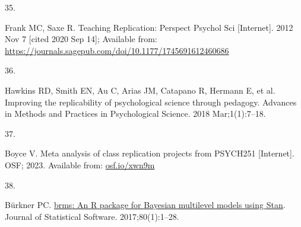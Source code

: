 \documentclass[
  english,
  a4paper,
]{article}
\newlength{\cslhangindent}
\newlength{\csllabelwidth}
\newlength{\cslentryspacingunit} %
\newenvironment{CSLReferences}[2] %
 {%
  \setlength{\parindent}{0pt}
  \ifodd #1
  \let\oldpar\par
  \def\par{\hangindent=\cslhangindent\oldpar}
  \fi
  \setlength{\parskip}{#2\cslentryspacingunit}
 }%
 {}
\newcommand{\CSLLeftMargin}[1]{\parbox[t]{\csllabelwidth}{#1}}
\newcommand{\CSLRightInline}[1]{\parbox[t]{\linewidth - \csllabelwidth}{#1}\break}
\begin{document}
\begin{CSLReferences}{0}{0}
\leavevmode{}%
\CSLLeftMargin{35. }%
\CSLRightInline{Frank MC, Saxe R. Teaching {Replication}: Perspect Psychol Sci {[}Internet{]}. 2012 Nov 7 {[}cited 2020 Sep 14{]}; Available from: \url{https://journals.sagepub.com/doi/10.1177/1745691612460686}}

\leavevmode{}%
\CSLLeftMargin{36. }%
\CSLRightInline{Hawkins RD, Smith EN, Au C, Arias JM, Catapano R, Hermann E, et al. Improving the replicability of psychological science through pedagogy. Advances in Methods and Practices in Psychological Science. 2018 Mar;1(1):7--18. }

\leavevmode{}%
\CSLLeftMargin{37. }%
\CSLRightInline{Boyce V. Meta analysis of class replication projects from PSYCH251 {[}Internet{]}. OSF; 2023. Available from: \href{https://osf.io/xwn9m}{osf.io/xwn9m}}

\leavevmode{}%
\CSLLeftMargin{38. }%
\CSLRightInline{Bürkner PC. \href{https://doi.org/10.18637/jss.v080.i01}{{brms}: An {R} package for {Bayesian} multilevel models using {Stan}}. Journal of Statistical Software. 2017;80(1):1--28. }

\end{CSLReferences}
\end{document}
